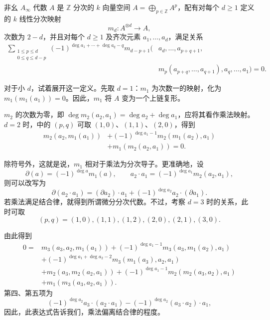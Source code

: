 \begin{definition}\label{def:8.4}
非幺 $A_\infty$ 代数 $A$ 是 $\mathbb Z$ 分次的 $k$ 向量空间 $A=\bigoplus_{p\in\mathbb Z}A^p$，配有对每个 $d\geq1$ 定义的 $k$ 线性分次映射
\[
m_d\colon A^{\otimes d}\longrightarrow A,
\]
次数为 $2-d$，并且对每个 $d\geq1$ 及齐次元素 $a_1,\ldots,a_d$，满足关系
\begin{equation}\label{eq:8.2}
\begin{aligned}
\sum_{\substack{1\leq p\leq d\\0\leq q\leq d-p}}
(-1)^{\deg a_1+\cdots+\deg a_q-q}
m_{d-p+1}\bigl(&a_d,\ldots,a_{p+q+1},\\
&m_p(a_{p+q},\ldots,a_{q+1}),a_q,\ldots,a_1\bigr)=0.
\end{aligned}
\end{equation}
\end{definition}

对于小 $d$，试着展开这一定义。先取 $d=1$：$m_1$ 为次数一的映射，化为 $m_1(m_1(a_1))=0$。因此，$m_1$ 将 $A$ 变为一个上链复形。

$m_2$ 的次数为零，即 $\deg m_2(a_2,a_1)=\deg a_2+\deg a_1$，应将其看作乘法映射。$d=2$ 时，中的 $(p,q)$ 可取 $(1,0)$、$(1,1)$、$(2,0)$，得到
\begin{equation}\label{eq:8.3}
\begin{aligned}
m_2(a_2,m_1(a_1))
&+(-1)^{\deg a_1-1}m_2(m_1(a_2),a_1)\\
&+m_1(m_2(a_2,a_1))=0.
\end{aligned}
\end{equation}

除符号外，这就是说，$m_1$ 相对于乘法为分次导子。更准确地，设
\[
\partial(a)=(-1)^{\deg a}m_1(a),\qquad
a_2\cdot a_1=(-1)^{\deg a_1}m_2(a_2,a_1),
\]
则可以改写为
\begin{equation}\label{eq:8.4}
\partial(a_2\cdot a_1)
=(\partial a_2)\cdot a_1+(-1)^{\deg a_2}a_2\cdot(\partial a_1).
\end{equation}
若乘法满足结合律，就得到所谓微分分次代数。不过，考察 $d=3$ 时的关系，此时可取
\[
(p,q)=(1,0),(1,1),(1,2),(2,0),(2,1),(3,0).
\]

由此得到
\begin{equation}\label{eq:8.5}
\begin{aligned}
0={}&m_3(a_3,a_2,m_1(a_1))
+(-1)^{\deg a_1-1}m_3(a_3,m_1(a_2),a_1)\\
&+(-1)^{\deg a_1+\deg a_2-2}m_3(m_1(a_3),a_2,a_1)\\
&+m_2(a_3,m_2(a_2,a_1))
+(-1)^{\deg a_1-1}m_2(m_2(a_3,a_2),a_1)\\
&+m_1(m_3(a_3,a_2,a_1)).
\end{aligned}
\end{equation}
第四、第五项为
\[
(-1)^{\deg a_2}a_3\cdot(a_2\cdot a_1)
-(-1)^{\deg a_2}(a_3\cdot a_2)\cdot a_1,
\]
因此，此表达式告诉我们，乘法偏离结合律的程度。

